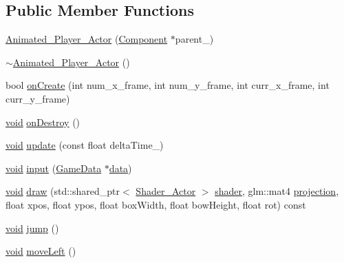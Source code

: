 \subsection*{Public Member Functions}
\begin{DoxyCompactItemize}
\item 
\hyperlink{classAnimated__Player__Actor_a223689b724b4983b4122adf665eb61d3}{Animated\+\_\+\+Player\+\_\+\+Actor} (\hyperlink{classComponent}{Component} $\ast$parent\+\_\+)
\item 
\hyperlink{classAnimated__Player__Actor_a34e25dba15914d9dd3596f35c387ffd6}{$\sim$\+Animated\+\_\+\+Player\+\_\+\+Actor} ()
\item 
bool \hyperlink{classAnimated__Player__Actor_aa7ac745ffba6976efc31a31370166017}{on\+Create} (int num\+\_\+x\+\_\+frame, int num\+\_\+y\+\_\+frame, int curr\+\_\+x\+\_\+frame, int curr\+\_\+y\+\_\+frame)
\item 
\hyperlink{imgui__impl__opengl3__loader_8h_ac668e7cffd9e2e9cfee428b9b2f34fa7}{void} \hyperlink{classAnimated__Player__Actor_ac6c4259340bfa000195b69f7eef1ae17}{on\+Destroy} ()
\item 
\hyperlink{imgui__impl__opengl3__loader_8h_ac668e7cffd9e2e9cfee428b9b2f34fa7}{void} \hyperlink{classAnimated__Player__Actor_aa383063c812e8b0015f18485ab000d65}{update} (const float delta\+Time\+\_\+)
\item 
\hyperlink{imgui__impl__opengl3__loader_8h_ac668e7cffd9e2e9cfee428b9b2f34fa7}{void} \hyperlink{classAnimated__Player__Actor_a2528c4e08b2b78ceb360176000f2c585}{input} (\hyperlink{structGameData}{Game\+Data} $\ast$\hyperlink{imgui__impl__opengl3__loader_8h_abd87654504355b4c1bb002dcb1d4d16a}{data})
\item 
\hyperlink{imgui__impl__opengl3__loader_8h_ac668e7cffd9e2e9cfee428b9b2f34fa7}{void} \hyperlink{classAnimated__Player__Actor_a0f47a39cced0b631b6e6ef75243ef181}{draw} (std\+::shared\+\_\+ptr$<$ \hyperlink{classShader__Actor}{Shader\+\_\+\+Actor} $>$ \hyperlink{imgui__impl__opengl3__loader_8h_a57b2a96adb1d51204909a82d861e395e}{shader}, glm\+::mat4 \hyperlink{main__menu__state_8cpp_a565d92bfbcc4a481d2d35f3850a382f7}{projection}, float xpos, float ypos, float box\+Width, float bow\+Height, float rot) const
\item 
\hyperlink{imgui__impl__opengl3__loader_8h_ac668e7cffd9e2e9cfee428b9b2f34fa7}{void} \hyperlink{classAnimated__Player__Actor_a05ff973dde6e3409c66b933407748997}{jump} ()
\item 
\hyperlink{imgui__impl__opengl3__loader_8h_ac668e7cffd9e2e9cfee428b9b2f34fa7}{void} \hyperlink{classAnimated__Player__Actor_a2a16f88ffccdd67e6d7f0df4a9374754}{move\+Left} ()

\end{DoxyCompactItemize}
